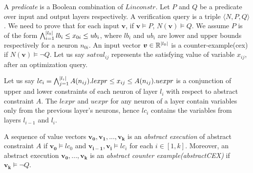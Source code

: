 A {\em predicate} is a Boolean combination of $Linconstr$.
Let $P$ and $Q$ be a predicate over input and output layers respectively.
A verification query is a triple $\langle N, P, Q \rangle$.
We need to prove that for each input $\boldsymbol{v}$,
if $\boldsymbol{v} \models P$, $N(\boldsymbol{v}) \models Q$.
We assume $P$ is of the form
$\bigwedge_{i=1}^{|l_0|}lb_i \leq x_{0i} \leq ub_i$, where $lb_i$ and $ub_i$ are lower and upper bounds respectively for a neuron $n_{0i}$.
An input vector $\boldsymbol{v} \in \mathbb{R}^{|l_0|}$ is a counter-example(cex) if $N(\boldsymbol{v}) \models \lnot Q$. 
Let us say $satval_{ij}$ represents the satisfying value of variable $x_{ij}$, after an optimization query. 










Let us say $lc_i = \bigwedge_{j=1}^{|l_i|} A(n_{ij}).lexpr \leq x_{ij} \leq  A(n_{ij}).uexpr$ is a 
conjunction of upper and lower constraints of each neuron of layer $l_i$ with respect to abstract constraint $A$.
The $lexpr$ and $uexpr$ for any neuron of a layer contain variables only from the previous layer's neurons, 
hence $lc_i$ contains the variables from layers $l_{i-1}$ and $l_i$. 

\begin{df}
  A sequence of value vectors $\boldsymbol{v_0}, \boldsymbol{v_1}, ... , \boldsymbol{v_k}$ is an 
  {\em abstract execution} of abstract constraint $A$ if 
  $\boldsymbol{v_0} \models lc_0$ and $\boldsymbol{v_{i-1}}, \boldsymbol{v_i} \models lc_i$ for each $i \in [1,k]$.  
 Moreover, an abstract execution $\boldsymbol{v_0,...,v_k}$ is
 an {\em abstract counter example(abstractCEX)} if $\boldsymbol{v_k} \models \lnot Q$.
\end{df}



